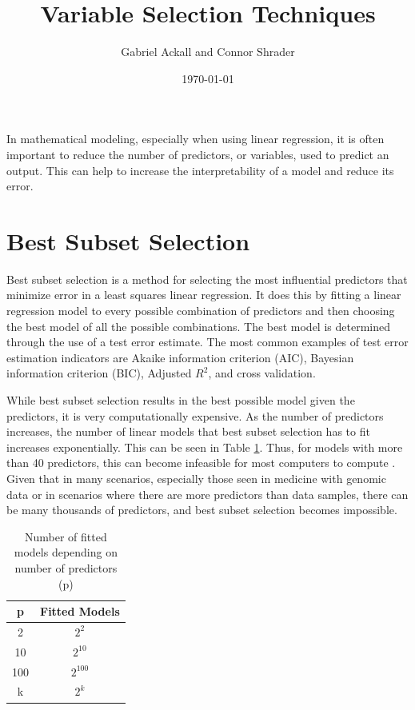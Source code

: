 \documentclass{article}
\title{Variable Selection Techniques}
\author{Gabriel Ackall and Connor Shrader}
\date{\today}
\begin{document}
\maketitle

In mathematical modeling, especially when using linear regression, it is often important to reduce the number of predictors, or variables, used to predict an output. This can help to increase the interpretability of a model and reduce its error.

\section{Best Subset Selection}
Best subset selection is a method for selecting the most influential predictors that minimize error in a least squares linear regression. It does this by fitting a linear regression model to every possible combination of predictors and then choosing the best model of all the possible combinations. The best model is determined through the use of a test error estimate. The most common examples of test error estimation indicators are Akaike information criterion (AIC), Bayesian information criterion (BIC), Adjusted $R^2$, and cross validation.

While best subset selection results in the best possible model given the predictors, it is very computationally expensive. As the number of predictors increases, the number of linear models that best subset selection has to fit increases exponentially. This can be seen in Table \ref{tab:subset-combinations}. Thus, for models with more than 40 predictors, this can become infeasible for most computers to compute \cite{james2013introduction}. Given that in many scenarios, especially those seen in medicine with genomic data or in scenarios where there are more predictors than data samples, there can be many thousands of predictors, and best subset selection becomes impossible.

\begin{table}[h!]
	\centering
	\caption{Number of fitted models depending on number of predictors (p)}
	\vspace{0.1in}
	\begin{tabular}{c|c}
		\hline
		p  &  Fitted Models\\
		\hline
		2   & $2^2$ \\
		10  & $2^{10}$ \\
		100 & $2^{100}$ \\
		k   & $2^k$ \\
	\end{tabular}
\label{tab:subset-combinations}
\end{table}
\end{document}
